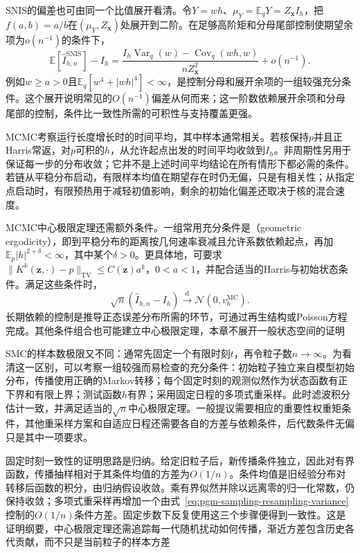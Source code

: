SNIS的偏差也可由同一个比值展开看清。令$Y=wh$、$\mu_Y=\mathbb{E}_qY=Z_{\bm{x}}I_h$，把$f(a,b)=a/b$在$(\mu_Y,Z_{\bm{x}})$处展开到二阶。在足够高阶矩和分母尾部控制使期望余项为$o(n^{-1})$的条件下，
\begin{equation}
  \mathbb{E}[\widehat I_{h,n}^{\mathrm{SNIS}}]-I_h
    =\frac{I_h\operatorname{Var}_q(w)-\operatorname{Cov}_q(wh,w)}
            {n Z_{\bm{x}}^2}+o(n^{-1}).
  \label{eq:pgm-sampling-snis-bias}
\end{equation}
例如$w\geq a>0$且$\mathbb{E}_q[w^4+|wh|^4]<\infty$，是控制分母和展开余项的一组较强充分条件。这个展开说明常见的$O(n^{-1})$偏差从何而来；这一阶数依赖展开余项和分母尾部的控制，条件比一致性所需的可积性与支持覆盖更强。

MCMC考察运行长度增长时的时间平均，其中样本通常相关。若核保持$p$并且正Harris常返，对$p$可积的$h$，从允许起点出发的时间平均收敛到$I_h$。非周期性另用于保证每一步的分布收敛；它并不是上述时间平均结论在所有情形下都必需的条件。若链从平稳分布启动，有限样本均值在期望存在时仍无偏，只是有相关性；从指定点启动时，有限预热用于减轻初值影响，剩余的初始化偏差还取决于核的混合速度。

MCMC中心极限定理还需额外条件。一组常用充分条件是（geometric ergodicity），即到平稳分布的距离按几何速率衰减且允许系数依赖起点，再加$\mathbb{E}_p|h|^{2+\delta}<\infty$，其中某个$\delta>0$。更具体地，可要求$\lVert K^k(\bm{z},\cdot)-p\rVert_{\mathrm{TV}}\leq C(\bm{z})a^k$，$0<a<1$，并配合适当的Harris与初始状态条件。满足这些条件时，
\[
  \sqrt n(\widehat I_{h,n}-I_h)
     \xrightarrow{\mathrm{d}}\mathcal{N}(0,v_h^{\mathrm{MC}}).
\]
长期依赖的控制是推导正态误差分布所需的环节，可通过再生结构或Poisson方程完成。其他条件组合也可能建立中心极限定理，本章不展开一般状态空间的证明

SMC的样本数极限又不同：通常先固定一个有限时刻$t$，再令粒子数$n\to\infty$。为看清这一区别，可以考察一组较强而易检查的充分条件：初始粒子独立来自模型初始分布，传播使用正确的Markov转移；每个固定时刻的观测似然作为状态函数有正下界和有限上界；测试函数$h$有界；采用固定日程的多项式重采样。此时滤波积分估计一致，并满足适当的$\sqrt n$中心极限定理。一般提议需要相应的重要性权重矩条件，其他重采样方案和自适应日程还需要各自的方差与依赖条件，后代数条件无偏只是其中一项要求。

固定时刻一致性的证明思路是归纳。给定旧粒子后，新传播条件独立，因此对有界函数，传播抽样相对于其条件均值的方差为$O(1/n)$。条件均值是旧经验分布对转移后函数的积分，由归纳假设收敛。乘有界似然并除以远离零的归一化常数，仍保持收敛；多项式重采样再增加一个由式~\eqref{eq:pgm-sampling-resampling-variance}控制的$O(1/n)$条件方差。固定步数下反复使用这三个步骤便得到一致性。这是证明纲要，中心极限定理还需追踪每一代随机扰动如何传播，渐近方差包含历史各代贡献，而不只是当前粒子的样本方差

